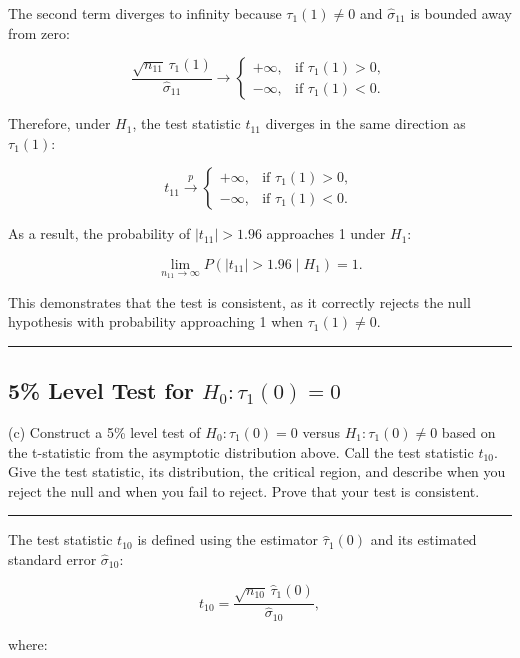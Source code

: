 \documentclass{article}
\newenvironment{colorparagraph}[1]{\par\color{#1}}{\par}
\begin{document}
The second term diverges to infinity because \( \tau_1(1) \neq 0 \) and \( \hat{\sigma}_{11} \) is bounded away from zero:

\[
\frac{\sqrt{n_{11}} \, \tau_1(1)}{\hat{\sigma}_{11}} \to 
\begin{cases}
+\infty, & \text{if } \tau_1(1) > 0, \\
-\infty, & \text{if } \tau_1(1) < 0.
\end{cases}
\]

Therefore, under \( H_1 \), the test statistic \( t_{11} \) diverges in the same direction as \( \tau_1(1) \):

\[
t_{11} \xrightarrow{p} 
\begin{cases}
+\infty, & \text{if } \tau_1(1) > 0, \\
-\infty, & \text{if } \tau_1(1) < 0.
\end{cases}
\]

As a result, the probability of \( |t_{11}| > 1.96 \) approaches 1 under \( H_1 \):

\[
\lim_{n_{11} \to \infty} P\left( |t_{11}| > 1.96 \mid H_1 \right) = 1.
\]

This demonstrates that the test is consistent, as it correctly rejects the null hypothesis with probability approaching 1 when \( \tau_1(1) \neq 0 \).

\begin{colorparagraph}{questioncolor}
\rule{\textwidth}{0.5pt}

\label{q1c}\subsection{5\% Level Test for \( H_0: \tau_1(0) = 0 \)}
(c) Construct a 5\% level test of \( H_0 : \tau_1(0) = 0 \) versus \( H_1 : \tau_1(0) \neq 0 \) based on the t-statistic from the asymptotic distribution above. Call the test statistic \( t_{10} \). Give the test statistic, its distribution, the critical region, and describe when you reject the null and when you fail to reject. Prove that your test is consistent.

\rule{\textwidth}{0.5pt}
\end{colorparagraph}

The test statistic \( t_{10} \) is defined using the estimator \( \hat{\tau}_1(0) \) and its estimated standard error \( \hat{\sigma}_{10} \):

\[
t_{10} = \frac{\sqrt{n_{10}} \, \hat{\tau}_1(0)}{\hat{\sigma}_{10}},
\]

where:
\end{document}
